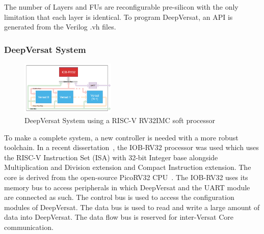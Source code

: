 \documentclass[conference]{IEEEtran}
\begin{document}
The number of Layers and FUs are reconfigurable pre-silicon with the only limitation
that each layer is identical. To program DeepVersat, an API is generated
from the Verilog .vh files. 




\subsubsection{DeepVersat System}

\begin{figure}[!htbp]
    \centering
    \includegraphics[width=0.4\textwidth]{Figures/deep-Versat-top.png}
    \caption{DeepVersat System using a RISC-V RV32IMC soft processor~\cite{valter:deepversat}}
    \label{figure:deepversattop}
\end{figure} 

\quad To make a complete system, a new controller is needed with a more robust toolchain.
In a recent dissertation~\cite{valter:deepversat}, the IOB-RV32 processor was used which uses the RISC-V Instruction Set (ISA) with 32-bit Integer base alongside Multiplication and Division extension and Compact Instruction extension.
 The core is derived from
the open-source PicoRV32 CPU~\cite{picorv}.
The IOB-RV32 uses its memory bus to access peripherals in which DeepVersat and the UART module are connected as such.
The control bus is used to access the configuration modules of DeepVersat. The data bus is used to read and write
a large amount of data into DeepVersat. The data flow bus is reserved for inter-Versat Core communication.

\end{document}
